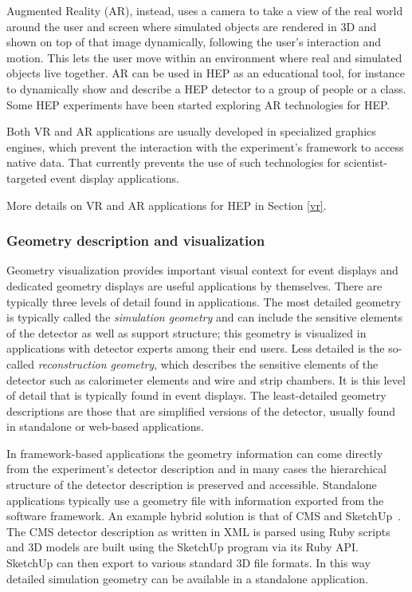 \documentclass[12pt,a4paper]{article}
\begin{document}
Augmented Reality (AR), instead, uses a camera to take a view of the real world around the user and screen where simulated objects are rendered in 3D and shown on top of that image dynamically, following the user's interaction and motion. This lets the user move within an environment where real and simulated objects live together. AR can be used in HEP as an educational tool, for instance to dynamically show and describe a HEP detector to a group of people or a class. Some HEP experiments have been started exploring AR  technologies for HEP.

Both VR and AR applications are usually developed in specialized graphics engines, which prevent the interaction with the experiment's framework to access native data. That currently prevents the use of such technologies for scientist-targeted event display applications.

More details on VR and AR applications for HEP in Section \ref{vr}.




\hypertarget{geometry-description}{%
\subsubsection{Geometry description and visualization}\label{geometry-description}}

Geometry visualization provides important visual context for event displays and dedicated geometry displays are useful applications by themselves.
There are typically three levels of detail found in applications. The most detailed geometry is typically called the \textit{simulation geometry}
and can include the sensitive elements of the detector as well as support structure; this geometry is visualized in applications with detector experts among their end users. Less detailed is the so-called \textit{reconstruction geometry}, which describes the sensitive elements of the detector such as calorimeter elements and wire and strip chambers. It is this level of
detail that is typically found in event displays. The least-detailed geometry descriptions are those that are simplified versions of the
detector, usually found in standalone or web-based applications.




In framework-based applications the geometry information can come directly from the experiment's detector description and in
 many cases the hierarchical structure of the detector description is preserved and accessible. Standalone applications
typically use a geometry file with information exported from the software framework. An example hybrid solution is that of CMS and SketchUp~\cite{CMSSketchUp}.
The CMS detector description as written in XML is parsed using Ruby scripts and 3D models are built using the SketchUp program via its
Ruby API. SketchUp can then export to various standard 3D file formats. In this way detailed simulation geometry can be available in a standalone
application.
\end{document}
